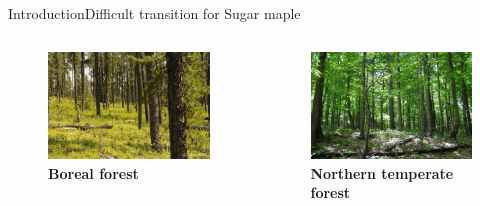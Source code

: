 \documentclass[table]{eecslides}
\begin{document}
\begin{frame}{Introduction}{Difficult transition for Sugar maple}
\pause
\begin{columns}[c]
	\begin{column}{.40\paperwidth}
		\begin{figure}
			\caption*{\textbf{Boreal forest}}
			\includegraphics[width=.40\paperwidth]{Figs/bor_forest.jpg}
		\end{figure}
	\end{column}
	\begin{column}{.40\paperwidth}
		\begin{figure}
			\caption*{\textbf{Northern temperate forest}}
			\includegraphics[width=.40\paperwidth]{Figs/temp_forest2.jpg}
		\end{figure}
	\end{column}
\end{columns}
\end{frame}

\end{document}
